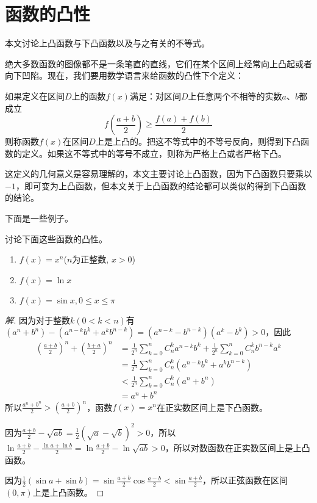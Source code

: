 
\section{函数的凸性}

本文讨论上凸函数与下凸函数以及与之有关的不等式。

绝大多数函数的图像都不是一条笔直的直线，它们在某个区间上经常向上凸起或者向下凹陷。现在，我们要用数学语言来给函数的凸性下个定义：
\begin{definition}
 如果定义在区间$D$上的函数$f(x)$满足：对区间$D$上任意两个不相等的实数$a$、$b$都成立
 \begin{equation}
   \label{eq:the-definition-of-convexity-function}
f(\frac{a+b}{2}) \geqslant \frac{f(a)+f(b)}{2}
 \end{equation}
则称函数$f(x)$在区间$D$上是上凸的。把这不等式中的不等号反向，则得到下凸函数的定义。如果这不等式中的等号不成立，则称为严格上凸或者严格下凸。
\end{definition}
这定义的几何意义是容易理解的，本文主要讨论上凸函数，因为下凸函数只要乘以$-1$，即可变为上凸函数，但本文关于上凸函数的结论都可以类似的得到下凸函数的结论。

下面是一些例子。
\begin{example}
  讨论下面这些函数的凸性。
  \begin{enumerate}
  \item $f(x)=x^n$($n$为正整数, $x>0$)
  \item $f(x)=\ln{x}$
  \item $f(x)=\sin{x}, 0 \leqslant x \leqslant \pi$
  \end{enumerate}
\end{example}

\begin{proof}[解]
因为对于整数$k(0 < k < n)$有$(a^n+b^n)-(a^{n-k}b^k+a^kb^{n-k})=(a^{n-k}-b^{n-k})(a^k-b^k)>0$，因此
\begin{equation}
  \begin{split}
\left( \frac{a+b}{2} \right)^n + \left( \frac{b+a}{2} \right)^n & = \frac{1}{2^n} \sum_{k=0}^nC_n^ka^{n-k}b^k + \frac{1}{2^n}\sum_{k=0}^nC_n^kb^{n-k}a^k \\
& = \frac{1}{2^n} \sum_{k=0}^n C_n^k \left( a^{n-k}b^k+a^kb^{n-k} \right) \\
& < \frac{1}{2^n} \sum_{k=0}^n C_n^k \left( a^n+b^n \right) \\
& = a^n+b^n
\end{split}
\end{equation}
所以$\frac{a^n+b^n}{2}>\left( \frac{a+b}{2} \right)^n$，函数$f(x)=x^n$在正实数区间上是下凸函数。

因为$\frac{a+b}{2}-\sqrt{ab}=\frac{1}{2}(\sqrt{a}-\sqrt{b})^2>0$，所以 $\ln{\frac{a+b}{2}}-\frac{\ln{a}+\ln{b}}{2}=\ln{\frac{a+b}{2}}-\ln{\sqrt{ab}}>0$，所以对数函数在正实数区间上是上凸函数。

因为$\frac{1}{2}(\sin{a}+\sin{b})=\sin{\frac{a+b}{2}}\cos{\frac{a-b}{2}} < \sin{\frac{a+b}{2}}$，所以正弦函数在区间$(0,\pi)$上是上凸函数。
\end{proof}

